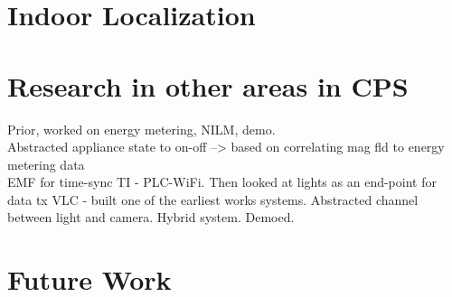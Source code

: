 \documentclass[10pt]{article}
\begin{document}
\section{Indoor Localization}

\section{Research in other areas in CPS}
Prior, worked on energy metering, NILM, demo.\\
Abstracted appliance state to on-off --> based on correlating mag fld to energy metering data\\
EMF for time-sync
TI - PLC-WiFi. Then looked at lights as an end-point for data tx
VLC - built one of the earliest works systems. Abstracted channel between light and camera. Hybrid system. Demoed. 

\section{Future Work}













\end{document}

